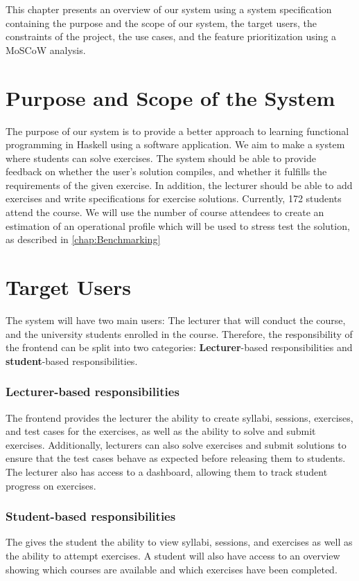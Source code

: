 This chapter presents an overview of our system using a system specification containing the purpose and the scope of our system, the target users, the constraints of the project, the use cases, and the feature prioritization using a MoSCoW analysis.

\section{Purpose and Scope of the System}
The purpose of our system is to provide a better approach to learning functional programming in Haskell using a software application.
We aim to make a system where students can solve exercises. The system should be able to provide feedback on whether the user's solution compiles, and whether it fulfills the requirements of the given exercise.
In addition, the lecturer should be able to add exercises and write specifications for exercise solutions.  
Currently, 172 students attend the course.
We will use the number of course attendees to create an estimation of an operational profile which will be used to stress test the solution, as described in \ref{chap:Benchmarking}

\section{Target Users}
The system will have two main users: The lecturer that will conduct the course, and the university students enrolled in the course.
Therefore, the responsibility of the frontend can be split into two categories: \textbf{Lecturer}-based responsibilities and \textbf{student}-based responsibilities.


\subsubsection*{Lecturer-based responsibilities}
The frontend provides the lecturer the ability to create syllabi, sessions, exercises, and test cases for the exercises, as well as the ability to solve and submit exercises. Additionally, lecturers can also solve exercises and submit solutions to ensure that the test cases behave as expected before releasing them to students.
The lecturer also has access to a dashboard, allowing them to track student progress on exercises.

\subsubsection*{Student-based responsibilities}
The \frontend{} gives the student the ability to view syllabi, sessions, and exercises as well as the ability to attempt exercises. A student will also have access to an overview showing which courses are available and which exercises have been completed.

